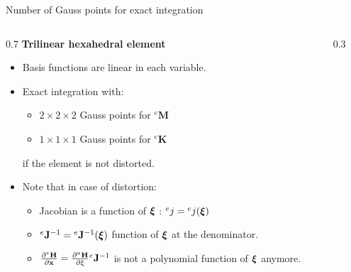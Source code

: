 \documentclass[aspectratio=169]{beamer}
\begin{document}
{\begin{frame}{Number of Gauss points for exact integration}
  \begin{columns}
    \begin{column}{0.7\textwidth}
      \textbf{Trilinear hexahedral element}
      \begin{itemize}
        \item Basis functions are linear in each variable.
        \item Exact integration with:
              \begin{itemize}
                \item $2\times2\times2$ Gauss points for ${}^e\mathbf M$
                \item $1\times1\times1$ Gauss points for ${}^e\mathbf K$
              \end{itemize}
              if the element is not distorted.
        \item Note that in case of distortion:
              \begin{itemize}
                \item Jacobian is a function of $\boldsymbol\xi$ : ${}^ej={}^ej(\boldsymbol\xi)$\vspace{0.2cm}
                \item ${}^e\mathbf J^{-1}={}^e\mathbf J^{-1}(\boldsymbol\xi)$ function of $\boldsymbol\xi$ at the denominator.
                \item $\frac{\partial {}^e\mathbf H}{\partial \bold x}=\frac{\partial {}^a\mathbf H}{\partial \bold \xi} {}^e\mathbf J^{-1}$ is not a polynomial function of $\boldsymbol\xi$ anymore.
              \end{itemize}
      \end{itemize}
    \end{column}
    \begin{column}{0.3\textwidth}
      \centering
\end{column}
\end{columns}
\end{frame}}
\end{document}
